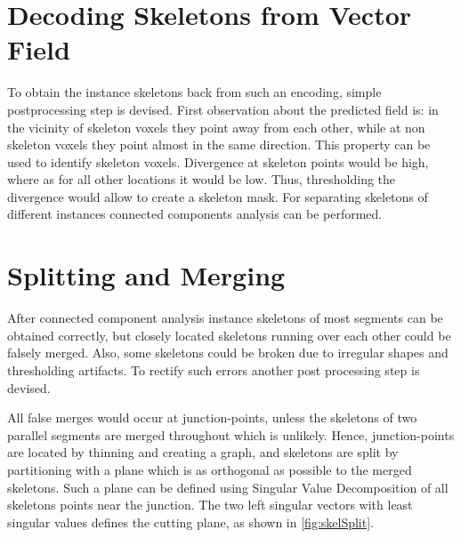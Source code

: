 \section{Decoding Skeletons from Vector Field}
To obtain the instance skeletons back from such an encoding, simple postprocessing step is devised. First observation about the predicted field is: in the vicinity of skeleton voxels they point away from each other, while at non skeleton voxels they point almost in the same direction. This property can be used to identify skeleton voxels. Divergence at skeleton points would be high, where as for all other locations it would be low. Thus, thresholding the divergence would allow to create a skeleton mask. For separating skeletons of different instances connected components analysis can be performed.

\section{Splitting and Merging}
After connected component analysis instance skeletons of most segments can be obtained correctly, but closely located skeletons running over each other could be falsely merged. Also, some skeletons could be broken due to irregular shapes and thresholding artifacts. To rectify such errors another post processing step is devised.

All false merges would occur at junction-points, unless the skeletons of two parallel segments are merged throughout which is unlikely. Hence, junction-points are located by thinning and creating a graph, and skeletons are split by partitioning with a plane which is as orthogonal as possible to the merged skeletons. Such a plane can be defined using Singular Value Decomposition of all skeletons points near the junction. The two left singular vectors with least singular values defines the cutting plane, as shown in \autoref{fig:skelSplit}.

